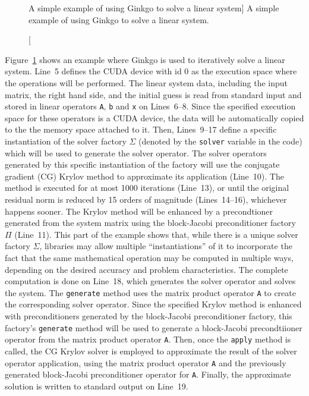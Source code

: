 \begin{figure}
\begin{center}

\end{center}
\caption
[A simple example of using Ginkgo to solve a linear system]
{A simple example of using Ginkgo to solve a linear system.}
\label{conclusion:fig:ginkgo-example}
\end{figure}

Figure~\ref{conclusion:fig:ginkgo-example} shows an example where Ginkgo is used
to iteratively solve a linear system. Line~5 defines the CUDA device with id 0
as the execution space where the operations will be performed. The linear system
data, including the input matrix, the right hand side, and the initial guess is
read from standard input and stored in linear operators \texttt{A}, \texttt{b}
and \texttt{x} on Lines~6--8. Since the specified execution space for these
operators is a CUDA device, the data will be automatically copied to the
the memory space attached to it. Then, Lines~9--17 define a specific
instantiation of the solver factory $\Sigma$ (denoted by the \texttt{solver}
variable in the code) which will be used to generate the solver operator. The
solver operators generated by this specific instantiation of the factory will
use the conjugate gradient (CG) Krylov method to approximate its application
(Line~10). The method is executed for at most 1000 iterations (Line~13), or
until the original residual norm is reduced by 15 orders of magnitude
(Lines~14--16), whichever happens sooner. The Krylov method will be enhanced by
a precondtioner generated from the system matrix using the block-Jacobi
preconditioner factory $\Pi$ (Line~11). This part of the example shows that,
while there is a unique solver factory $\Sigma$, libraries may allow multiple
``instantiations'' of it to incorporate the fact that the same mathematical
operation may be computed in multiple ways, depending on the desired accuracy
and problem characteristics.  The complete computation is done on Line~18, which
generates the solver operator and solves the system. The \texttt{generate}
method uses the matrix product operator \texttt{A} to create the corresponding
solver operator.  Since the specified Krylov method is enhanced with
preconditioners generated by the block-Jacobi preconditioner factory, this
factory's \texttt{generate} method will be used to generate a block-Jacobi
precondtiioner operator from the matrix product operator \texttt{A}. Then, once
the \texttt{apply} method is called, the CG Krylov solver is employed to
approximate the result of the solver operator application, using the matrix
product operator \texttt{A} and the previously generated block-Jacobi
preconditioner operator for \texttt{A}.  Finally, the approximate solution is
written to standard output on Line~19.
